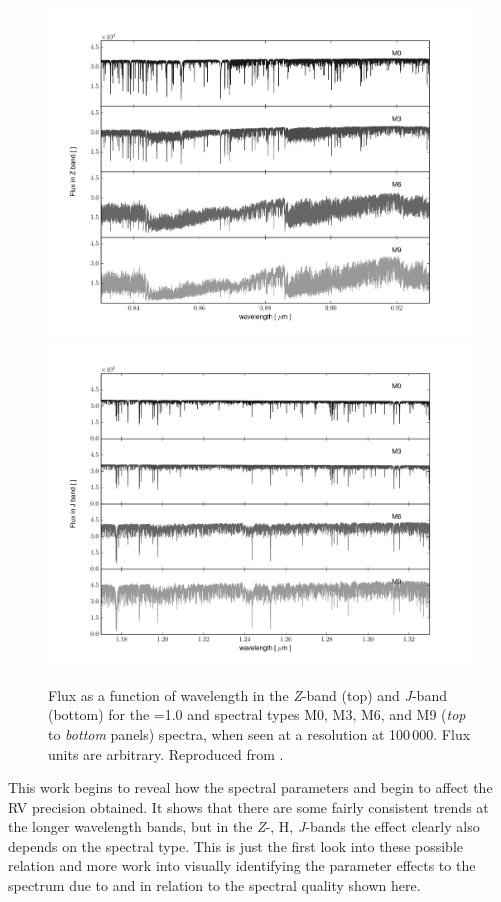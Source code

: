 \begin{figure}
    \centering
    \includegraphics[width=0.9\linewidth]{figures/information-content/figueria_2016_figures/Zband}\\
    \includegraphics[width=0.9\linewidth]{figures/information-content/figueria_2016_figures/Jband}
    \caption{Flux as a function of wavelength in the \emph{Z}-band (top) and \emph{J}-band (bottom) for the \Vsini{}=1.0\kmps{} and spectral types {M0}, {M3}, {M6}, and {M9} (\textit{top} to \textit{bottom} panels) spectra, when seen at a resolution at 100\,000. Flux units are arbitrary. Reproduced from \citet{figueira_radial_2016}.}
    \label{fig:z_and_j_spectra}
\end{figure}

This work begins to reveal how the spectral parameters \Logg{} and \feh{} begin to affect the RV precision obtained. 
It shows that there are some fairly consistent trends at the longer wavelength bands, but in the \emph{Z}-, {H}, \emph{J}-bands the effect clearly also depends on the spectral type.
This is just the first look into these possible relation and more work into visually identifying the parameter effects to the spectrum due to \feh{} and \Logg{} in relation to the spectral quality shown here.


